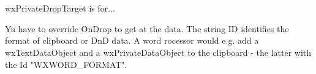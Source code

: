\section{}\label{wxprivatedroptarget}

wxPrivateDropTarget is for...






\label{wxprivatedroptargetwxprivatedroptarget}


\label{wxprivatedroptargetsetid}


Yu have to override OnDrop to get at the data.
The string ID identifies the format of clipboard or DnD data. A word
rocessor would e.g. add a wxTextDataObject and a wxPrivateDataObject
to the clipboard - the latter with the Id "WXWORD\_FORMAT".

\label{wxprivatedroptargetgetid}


